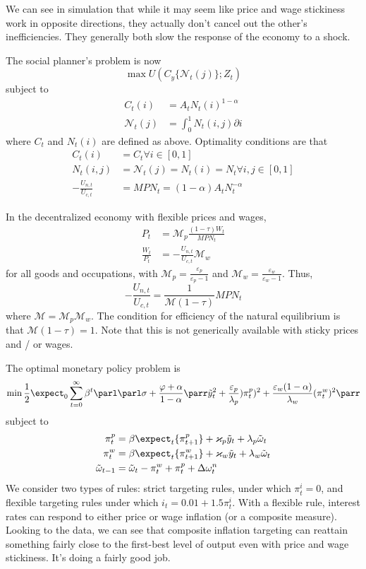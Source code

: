 \documentclass[10pt]{article}
\begin{document}
\begin{example}
	 We can see in simulation that while it may seem like price and wage stickiness work in opposite directions, they actually don't cancel out the other's inefficiencies. They generally both slow the response of the economy to a shock. 
\end{example}

The social planner's problem is now \[\max U(C_y \{\mathcal{N}_t(j)\};Z_t)\]subject to \begin{align*} C_t(i) &= A_tN_t(i)^{1-\alpha} \\ \mathcal{N}_t(j) &= \int_0^1 N_t(i,j)\partial i\end{align*}where $C_t$ and $N_t(i)$ are defined as above. Optimality conditions are that \begin{align*} C_t(i) &= C_t \forall i \in [0,1] \\ N_t(i,j) &= \mathcal{N}_t(j) = N_t(i) = N_t \forall i,j\in [0,1] \\ -\frac{U_{n,t}}{U_{c,t}} &= MPN_t = (1-\alpha)A_tN_t^{-\alpha}\end{align*}

In the decentralized economy with flexible prices and wages,\begin{align*} P_t &= \mathcal{M}_p \frac{(1-\tau)W_t}{MPN_t} \\ \frac{W_t}{P_t} &= -\frac{U_{n,t}}{U_{c,t}}\mathcal{M}_w\end{align*}for all goods and occupations, with $\mathcal{M}_p = \frac{\varepsilon_p}{\varepsilon_p-1}$ and $\mathcal{M}_w = \frac{\varepsilon_w}{\varepsilon_w-1}$. Thus, \[-\frac{U_{n,t}}{U_{c,t}} = \frac{1}{\mathcal{M}(1-\tau)}MPN_t\]where $\mathcal{M} = \mathcal{M}_p \mathcal{M}_w$. The condition for efficiency of the natural equilibrium is that $\mathcal{M}(1-\tau) = 1$. Note that this is not generically available with sticky prices and / or wages. 

The optimal monetary policy problem is \[\min \frac{1}{2}\expect_0 \sum_{t=0}^\infty \beta^t \parl \parl \sigma + \frac{\varphi+\alpha}{1-\alpha} \parr \tilde{y}_t^2 + \frac{\varepsilon_p}{\lambda_p})\pi_t^p)^2 + \frac{\varepsilon_w(1-\alpha)}{\lambda_w} (\pi_t^w)^2\parr\]subject to \begin{align*} \pi_t^p &= \beta \expect_t \{\pi_{t+1}^p\} + \varkappa_p \tilde{y}_t + \lambda_p \tilde{\omega}_t \\ 	\pi_t^w &= \beta \expect_t \{\pi_{t+1}^w\} + \varkappa_w \tilde{y}_t + \lambda_w \tilde{\omega}_t \\ \tilde{\omega}_{t-1} &= \tilde{\omega}_t - \pi_t^w + \pi_t^p + \Delta \omega_t^n
 \end{align*}
We consider two types of rules: strict targeting rules, under which $\pi_t^i = 0$, and flexible targeting rules under which $i_t = 0.01 + 1.5 \pi_t^i$. With a flexible rule, interest rates can respond to either price or wage inflation (or a composite measure). Looking to the data, we can see that composite inflation targeting can reattain something fairly close to the first-best level of output even with price and wage stickiness. It's doing a fairly good job.
\end{document}
